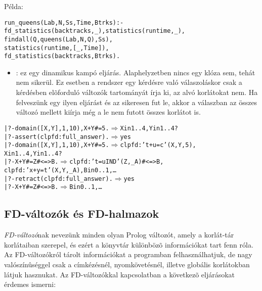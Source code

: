 Példa:

\begin{alltt}
% Az N-királynõ feladat összes megoldása Ss, Lab címkézéssel való
% végrehajtása Time msec-ig tart és Btrks FD visszalépést igényel.
run_queens(Lab, N, Ss, Time, Btrks) :-
        fd_statistics(backtracks, _), statistics(runtime, _),
        findall(Q, queens(Lab, N, Q), Ss),
        statistics(runtime, [_,Time]),
        fd_statistics(backtracks, Btrks).
\end{alltt}

\begin{itemize}
\item {}: ez egy dinamikus kampó eljárás.
        Alaphelyzetben nincs egy klóza sem, tehát nem sikerül. Ez
        esetben a rendszer egy kérdésre való válaszoláskor csak a
        kérdésben elõforduló változók tartományát írja ki, az alvó
        korlátokat nem. Ha felveszünk egy ilyen eljárást és az sikeresen
        fut le, akkor a válaszban az összes változó mellett kiírja még a
        le nem futott összes korlátot is.  
\end{itemize}

\begin{alltt}
| ?- domain([X,Y], 1, 10), X+Y#=5. \(\Rightarrow\) X in 1..4, Y in 1..4 ? 
| ?- assert(clpfd:full_answer).    \(\Rightarrow\) yes
| ?- domain([X,Y], 1, 10), X+Y#=5. \(\Rightarrow\) clpfd:'t+u=c'(X,Y,5), 
                                      X in 1..4, Y in 1..4 ? 
| ?- X+Y #= Z #<=> B.              \(\Rightarrow\) clpfd:'t=u IND'(Z,_A)#<=>B,
                                      clpfd:'x+y=t'(X,Y,_A), B in 0..1, \ldots
| ?- retract(clpfd:full_answer).   \(\Rightarrow\) yes
| ?- X+Y #= Z #<=> B.              \(\Rightarrow\) B in 0..1, \ldots
\end{alltt}

\subsection{FD-változók és FD-halmazok}
\label{fdset}

 \emph{FD-változó}nak nevezünk minden olyan Prolog változót,
amely a korlát-tár korlátaiban szerepel, és ezért a \clpfd könyvtár különbözõ
információkat tart fenn róla. Az FD-változókról tárolt információkat a
programban felhasználhatjuk, de nagy valószínûséggel csak a címkézésnél,
nyomkövetésnél, illetve globális korlátokban látjuk hasznukat.
\br
Az FD-változókkal kapcsolatban a következõ eljárásokat érdemes ismerni:

